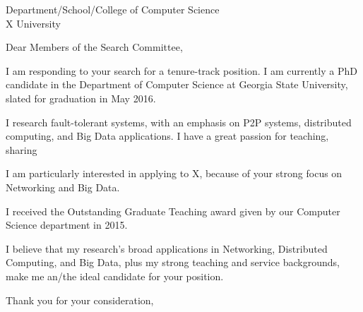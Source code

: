 \documentclass[12pt]{letter}
\date{}
\begin{document}
 
\begin{letter}{Department/School/College of Computer Science\\ X University} 
\opening{Dear Members of the Search Committee,} 
 
I am responding to your search for a tenure-track position.
I am currently a PhD candidate in the Department of Computer Science at Georgia State University, slated for graduation in May 2016.


I research fault-tolerant systems, with an emphasis  on P2P systems, distributed computing, and Big Data applications.
I have a great passion for teaching, sharing 


I am particularly interested in applying to X, because of your strong focus on Networking and Big Data.

I received the Outstanding Graduate Teaching award given by our Computer Science department in 2015.


I believe that my research's broad applications in Networking, Distributed Computing, and Big Data, plus my strong teaching and service backgrounds, make me an/the ideal candidate for your position.


\closing{Thank you for your consideration,} 
\end{letter} 
\end{document}

